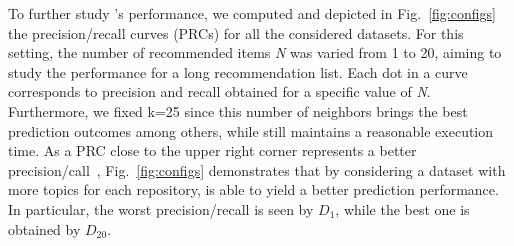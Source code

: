 


To further study \TF's performance, we computed and depicted in Fig.~\ref{fig:configs} the precision/recall curves (PRCs) for all the considered datasets. 
For this setting, the number of recommended items \emph{N} was varied from 1 to 20, aiming to study the performance for a long recommendation list. Each dot in a curve corresponds to precision and recall obtained for a specific value of \emph{N}. Furthermore, we fixed k=25 since this number of neighbors brings the best prediction outcomes among others, while still maintains a reasonable execution time. As a PRC close to the upper right corner represents a better precision/call~\cite{NGUYEN2020110460}, Fig.~\ref{fig:configs} demonstrates that by considering a dataset with more topics for each repository, \TFb is able to yield a better prediction performance. In particular, the worst precision/recall is seen by $D_{1}$, while the best one is obtained by $D_{20}$.



